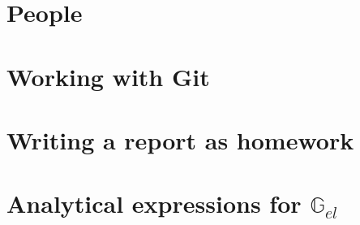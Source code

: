 \documentclass[a4paper]{article}
\numberwithin{equation}{section}
\newcommand{\G}{{\mathbb{G}}}
\begin{document}
\section{People}%
\newpage %
\section{Working with Git} %
\newpage %
\section{Writing a report as homework} %
\newpage %
\section{Analytical expressions for $\G_{el}$} \label{app:Gel} %



\newpage %
{\small } %
\newpage %

\newpage %
\listoftodos[Notes] %
\end{document}
